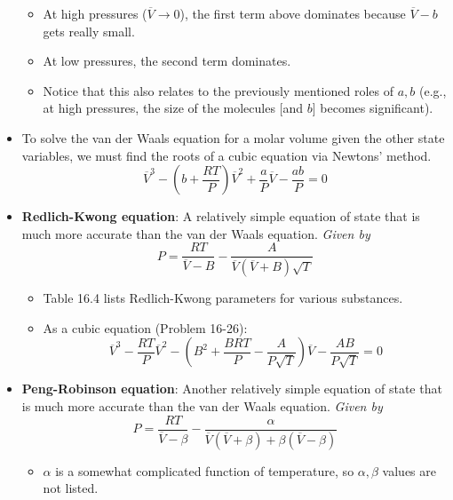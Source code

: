 \documentclass[../notes.tex]{subfiles}
\begin{document}
\begin{itemize}
\begin{equation*}
    \end{equation*}
    \begin{itemize}
        \item At high pressures ($\overline{V}\to 0$), the first term above dominates because $\overline{V}-b$ gets really small.
        \item At low pressures, the second term dominates.
        \item Notice that this also relates to the previously mentioned roles of $a,b$ (e.g., at high pressures, the size of the molecules [and $b$] becomes significant).
    \end{itemize}
    \item To solve the van der Waals equation for a molar volume given the other state variables, we must find the roots of a cubic equation via Newtons' method.
    \begin{equation*}
        \overline{V}^3-\left( b+\frac{RT}{P} \right)\overline{V}^2+\frac{a}{P}\overline{V}-\frac{ab}{P} = 0
    \end{equation*}
    \item \textbf{Redlich-Kwong equation}: A relatively simple equation of state that is much more accurate than the van der Waals equation. \emph{Given by}
    \begin{equation*}
        P = \frac{RT}{\overline{V}-B}-\frac{A}{\overline{V}(\overline{V}+B)\sqrt{T}}
    \end{equation*}
    \begin{itemize}
        \item Table 16.4 lists Redlich-Kwong parameters for various substances.
        \item As a cubic equation (Problem 16-26):
        \begin{equation*}
            \overline{V}^3-\frac{RT}{P}\overline{V}^2-\left( B^2+\frac{BRT}{P}-\frac{A}{P\sqrt{T}} \right)\overline{V}-\frac{AB}{P\sqrt{T}} = 0
        \end{equation*}
    \end{itemize}
    \item \textbf{Peng-Robinson equation}: Another relatively simple equation of state that is much more accurate than the van der Waals equation. \emph{Given by}
    \begin{equation*}
        P = \frac{RT}{\overline{V}-\beta}-\frac{\alpha}{\overline{V}(\overline{V}+\beta)+\beta(\overline{V}-\beta)}
    \end{equation*}
    \begin{itemize}
        \item $\alpha$ is a somewhat complicated function of temperature, so $\alpha,\beta$ values are not listed.

\end{itemize}
\end{itemize}
\end{document}
